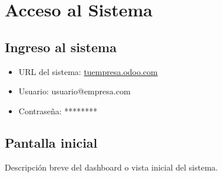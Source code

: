 \section{Acceso al Sistema}

\subsection{Ingreso al sistema}
\begin{itemize}
    \item URL del sistema: \href{https://tuempresa.odoo.com}{tuempresa.odoo.com}
    \item Usuario: usuario@empresa.com
    \item Contraseña: ********
\end{itemize}

\subsection{Pantalla inicial}
Descripción breve del dashboard o vista inicial del sistema.

